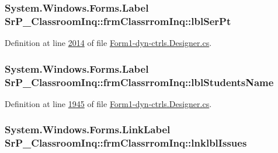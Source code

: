 \hypertarget{class_sr_p___classroom_inq_1_1frm_classrrom_inq_a26d1411dd06aa1ea7880dabb99777821}{
\subsubsection[{lbl\-Ser\-Pt}]{\setlength{\rightskip}{0pt plus 5cm}\-System.\-Windows.\-Forms.\-Label {\bf \-Sr\-P\-\_\-\-Classroom\-Inq\-::frm\-Classrrom\-Inq\-::lbl\-Ser\-Pt}}}
\label{class_sr_p___classroom_inq_1_1frm_classrrom_inq_a26d1411dd06aa1ea7880dabb99777821}


\-Definition at line \hyperlink{_form1-dyn-ctrls_8_designer_8cs_source_l02014}{2014} of file \hyperlink{_form1-dyn-ctrls_8_designer_8cs_source}{\-Form1-\/dyn-\/ctrls.\-Designer.\-cs}.

\hypertarget{class_sr_p___classroom_inq_1_1frm_classrrom_inq_ac87221e35b87aece56933aba4e90d11e}{
\subsubsection[{lbl\-Students\-Name}]{\setlength{\rightskip}{0pt plus 5cm}\-System.\-Windows.\-Forms.\-Label {\bf \-Sr\-P\-\_\-\-Classroom\-Inq\-::frm\-Classrrom\-Inq\-::lbl\-Students\-Name}}}
\label{class_sr_p___classroom_inq_1_1frm_classrrom_inq_ac87221e35b87aece56933aba4e90d11e}


\-Definition at line \hyperlink{_form1-dyn-ctrls_8_designer_8cs_source_l01945}{1945} of file \hyperlink{_form1-dyn-ctrls_8_designer_8cs_source}{\-Form1-\/dyn-\/ctrls.\-Designer.\-cs}.

\hypertarget{class_sr_p___classroom_inq_1_1frm_classrrom_inq_a814cf817eced89d772f9cba1053bf81b}{
\subsubsection[{lnklbl\-Issues}]{\setlength{\rightskip}{0pt plus 5cm}\-System.\-Windows.\-Forms.\-Link\-Label {\bf \-Sr\-P\-\_\-\-Classroom\-Inq\-::frm\-Classrrom\-Inq\-::lnklbl\-Issues}}}
\label{class_sr_p___classroom_inq_1_1frm_classrrom_inq_a814cf817eced89d772f9cba1053bf81b}


